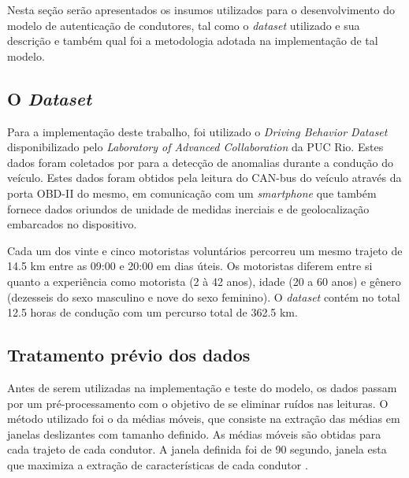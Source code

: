 \documentclass[conference,harvard,brazil,english]{sbatex}
\begin{document}
Nesta seção serão apresentados os insumos utilizados para o desenvolvimento do modelo de autenticação de condutores, tal como o \textit{dataset} utilizado e sua descrição e também qual foi a metodologia adotada na implementação de tal modelo. 

\subsection{O \textit{Dataset}}

Para a implementação deste trabalho, foi utilizado o \textit{Driving Behavior Dataset} disponibilizado pelo \textit{Laboratory of Advanced Collaboration} da PUC Rio. Estes dados foram coletados por \cite{OLIVEIRAVASCONCELOS2017a} para a detecção de anomalias durante a condução do veículo. Estes dados foram obtidos pela leitura do CAN-bus do veículo através da porta OBD-II do mesmo, em comunicação com um \textit{smartphone} que também fornece dados oriundos de unidade de medidas inerciais e de geolocalização embarcados no dispositivo. 

Cada um dos vinte e cinco motoristas voluntários percorreu um mesmo trajeto de 14.5 km entre as 09:00 e 20:00 em dias úteis. Os motoristas diferem entre si quanto a experiência como motorista (2 à 42 anos), idade (20 a 60 anos) e gênero (dezesseis do sexo masculino e nove do sexo feminino). O \textit{dataset} contém no total 12.5 horas de condução com um percurso total de 362.5 km. 

\subsection{Tratamento prévio dos dados}
    

Antes de serem utilizadas na implementação e teste do modelo, os dados passam por um pré-processamento com o objetivo de se eliminar ruídos nas leituras. O método utilizado foi o da médias móveis, que consiste na extração das médias em janelas deslizantes com tamanho definido. As médias móveis são obtidas para cada trajeto de cada condutor. A janela definida foi de 90 segundo, janela esta que maximiza a extração de características de cada condutor \cite{DeSouza2018}.
\end{document}
